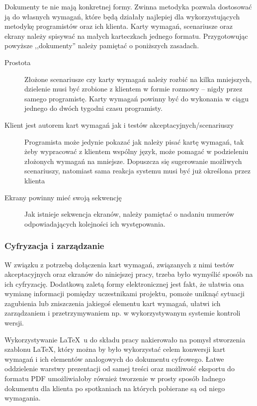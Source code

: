 Dokumenty te nie mają konkretnej formy. Zwinna metodyka pozwala dostosować ją do własnych wymagań, które będą działały najlepiej dla wykorzystujących metodykę programistów oraz ich klienta. Karty wymagań, scenariusze oraz ekrany należy spisywać na małych karteczkach jednego formatu. Przygotowując powyższe ,,dokumenty'' należy pamiętać o poniższych zasadach.

\begin{description}
    \item[Prostota]Złożone scenariusze czy karty wymagań należy rozbić na kilka mniejszych, dzielenie musi być zrobione z klientem w formie rozmowy -- nigdy przez samego programistę. Karty wymagań powinny być do wykonania w ciągu jednego do dwóch tygodni czasu programisty.
    \item[Klient jest autorem kart wymagań jak i testów akceptacyjnych/scenariuszy]Programista może jedynie pokazać jak należy pisać kartę wymagań, tak żeby wypracować z klientem wspólny język, może pomagać w podzieleniu złożonych wymagań na mniejsze. Dopuszcza się sugerowanie możliwych scenariuszy, natomiast sama reakcja systemu musi być już określona przez klienta
    \item[Ekrany powinny mieć swoją sekwencję]Jak istnieje sekwencja ekranów, należy pamiętać o nadaniu numerów odpowiadających kolejności ich występowania.
\end{description}

\subsubsection{Cyfryzacja i zarządzanie}
\label{sec:ZSWcyfryzacja}

W związku z potrzebą dołączenia kart wymagań, związanych z nimi testów akceptacyjnych oraz ekranów do niniejszej pracy, trzeba było wymyślić sposób na ich cyfryzację. Dodatkową zaletą formy elektronicznej jest fakt, że ułatwia ona wymianę informacji pomiędzy uczestnikami projektu, pomoże uniknąć sytuacji zagubienia lub zniszczenia jakiegoś elementu kart wymagań, ułatwi ich zarządzaniem i przetrzymywaniem np. w wykorzystywanym systemie kontroli wersji.

Wykorzystywanie \LaTeX~u do składu pracy nakierowało na pomysł stworzenia szablonu \LaTeX, który można by było wykorzystać celem konwersji kart wymagań i ich elementów analogowych do dokumentu cyfrowego. Łatwe oddzielenie warstwy prezentacji od samej treści oraz możliwość eksportu do formatu PDF umożliwiałoby również tworzenie w prosty sposób ładnego dokumentu dla klienta po spotkaniach na których pobierane są od niego wymagania.

